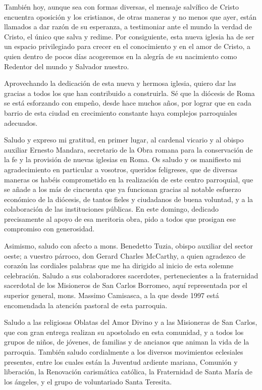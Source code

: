 También hoy, aunque sea con formas diversas, el mensaje salvífico de Cristo encuentra oposición y los cristianos, de otras maneras y no menos que ayer, están llamados a dar razón de su esperanza, a testimoniar ante el mundo la verdad de Cristo, el único que salva y redime. Por consiguiente, esta nueva iglesia ha de ser un espacio privilegiado para crecer en el conocimiento y en el amor de Cristo, a quien dentro de pocos días acogeremos en la alegría de su nacimiento como Redentor del mundo y Salvador nuestro.

Aprovechando la dedicación de esta nueva y hermosa iglesia, quiero dar las gracias a todos los que han contribuido a construirla. Sé que la diócesis de Roma se está esforzando con empeño, desde hace muchos años, por lograr que en cada barrio de esta ciudad en crecimiento constante haya complejos parroquiales adecuados.

Saludo y expreso mi gratitud, en primer lugar, al cardenal vicario y al obispo auxiliar Ernesto Mandara, secretario de la Obra romana para la conservación de la fe y la provisión de nuevas iglesias en Roma. Os saludo y os manifiesto mi agradecimiento en particular a vosotros, queridos feligreses, que de diversas maneras os habéis comprometido en la realización de este centro parroquial, que se añade a los más de cincuenta que ya funcionan gracias al notable esfuerzo económico de la diócesis, de tantos fieles y ciudadanos de buena voluntad, y a la colaboración de las instituciones públicas. En este domingo, dedicado precisamente al apoyo de esa meritoria obra, pido a todos que prosigan ese compromiso con generosidad.

Asimismo, saludo con afecto a mons. Benedetto Tuzia, obispo auxiliar del sector oeste; a vuestro párroco, don Gerard Charles McCarthy, a quien agradezco de corazón las cordiales palabras que me ha dirigido al inicio de esta solemne celebración. Saludo a sus colaboradores sacerdotes, pertenecientes a la fraternidad sacerdotal de los Misioneros de San Carlos Borromeo, aquí representada por el superior general, mons. Massimo Camisasca, a la que desde 1997 está encomendada la atención pastoral de esta parroquia.

Saludo a las religiosas Oblatas del Amor Divino y a las Misioneras de San Carlos, que con gran entrega realizan su apostolado en esta comunidad, y a todos los grupos de niños, de jóvenes, de familias y de ancianos que animan la vida de la parroquia. También saludo cordialmente a los diversos movimientos eclesiales presentes, entre los cuales están la Juventud ardiente mariana, Comunión y liberación, la Renovación carismática católica, la Fraternidad de Santa María de los ángeles, y el grupo de voluntariado Santa Teresita.

